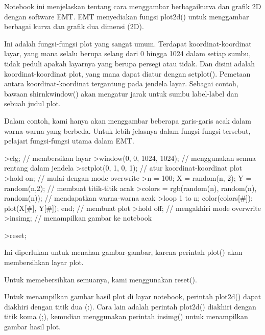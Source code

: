 \documentclass[a4paper,10pt]{article}
\begin{document}
\begin{eulernotebook}
\begin{eulercomment}
Notebook ini menjelaskan tentang cara menggambar berbagaikurva dan grafik 2D dengan software EMT. EMT
menyediakan fungsi plot2d() untuk menggambar berbagai kurva dan grafik dua dimensi (2D).

\end{eulercomment}
\begin{eulercomment}
Ini adalah fungsi-fungsi plot yang sangat umum. Terdapat koordinat-koordinat layar, yang mana selalu berupa
selang dari 0 hingga 1024 dalam setiap sumbu, tidak peduli apakah layarnya yang berupa persegi atau tidak. Dan
disini adalah koordinat-koordinat plot, yang mana dapat diatur dengan setplot(). Pemetaan antara
koordinat-koordinat tergantung pada jendela layar. Sebagai contoh, bawaan shirnkwindow() akan mengatur jarak
untuk sumbu label-label dan sebuah judul plot.

Dalam contoh, kami hanya akan menggambar beberapa garis-garis acak dalam warna-warna yang berbeda. Untuk lebih
jelasnya dalam fungsi-fungsi tersebut, pelajari fungsi-fungsi utama dalam EMT.
\end{eulercomment}
\begin{eulerprompt}
>clg; // membersikan layar
>window(0, 0, 1024, 1024); // menggunakan semua rentang dalam jendela
>setplot(0, 1, 0, 1); // atur koordinat-koordinat plot
>hold on; // mulai dengan mode overwrite
>n = 100; X = random(n, 2); Y = random(n,2); // membuat titik-titik acak
>colors = rgb(random(n), random(n), random(n)); // mendapatkan warna-warna acak
>loop 1 to n; color(colors[#]); plot(X[#], Y[#]); end; // membuat plot
>hold off; // mengakhiri mode overwrite
>insimg; // menampilkan gambar ke notebook
\end{eulerprompt}
\begin{eulerprompt}
>reset;
\end{eulerprompt}
\begin{eulercomment}
Ini diperlukan untuk menahan gambar-gambar, karena perintah plot() akan membersihkan layar plot.

Untuk memebersihkan semuanya, kami menggunakan reset().

Untuk menampilkan gambar hasil plot di layar notebook, perintah plot2d() dapat diakhiri dengan titik dua (:).
Cara lain adalah perintah plot2d() diakhiri dengan titik koma (;), kemudian menggunakan perintah insimg() untuk
menampilkan gambar hasil plot.


\end{eulercomment}
\end{eulernotebook}
\end{document}
